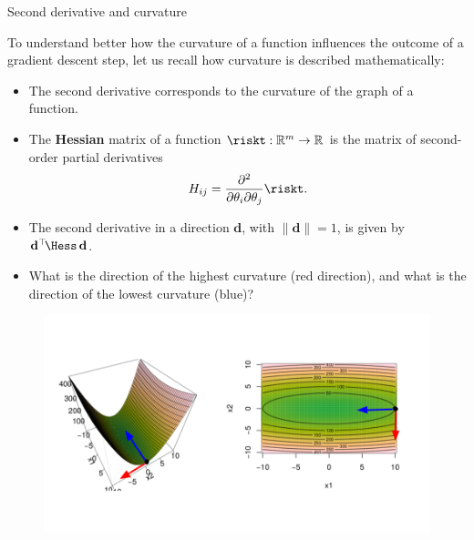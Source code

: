 \begin{vbframe}{Second derivative and curvature}

To understand better how the curvature of a function influences the outcome of a gradient descent step, let us recall how curvature is described mathematically: 

\begin{itemize}
  \item The second derivative corresponds to the curvature of the graph of a function. 
  \item The \textbf{Hessian} matrix of a function $\riskt: \mathbb{R}^m \to \mathbb{R}$ is the matrix of second-order partial derivatives
  $$
    H_{ij} = \frac{\partial^2}{\partial \theta_i \partial \theta_j} \riskt.
  $$
\end{itemize}

\framebreak 

\begin{itemize}
  \item The second derivative in a direction $\mathbf{d}$, %
   with $\|\mathbf{d}\| = 1$, is given by $\mathbf{d}^\top \!\Hess\,\mathbf{d}$.
  \item What is the direction of the highest curvature (red direction), and what is the direction of the lowest curvature (blue)?
\end{itemize}

\vspace*{-0.5cm}

\begin{figure}
\begin{center}
  \includegraphics{figure/curvature2.png}
\end{center}
\end{figure}

\framebreak


\end{vbframe}
